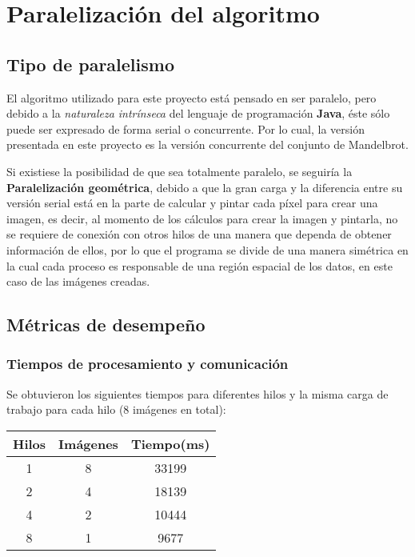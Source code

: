 \documentclass[12pt,a4paper]{article}
\begin{document}
		
	\section{Paralelización del algoritmo}	
		\subsection{Tipo de paralelismo}
			El algoritmo utilizado para este proyecto está pensado en ser paralelo, pero debido a la  \textit{naturaleza intrínseca} del lenguaje de programación \textbf{Java}, éste sólo puede ser expresado de forma serial o concurrente. Por lo cual, la versión presentada en este proyecto es la versión concurrente del conjunto de Mandelbrot.
			
			Si existiese la posibilidad de que sea totalmente paralelo, se seguiría la \textbf{Paralelización geométrica}, debido a que la gran carga y la diferencia entre su versión serial está en la parte de calcular y pintar cada píxel para crear una imagen, es decir, al momento de los cálculos para crear la imagen y pintarla, no se requiere de conexión con otros hilos de una manera que dependa de obtener información de ellos, por lo que el programa se divide de una manera simétrica en la cual cada proceso es responsable de una región espacial de los datos, en este caso de las imágenes creadas.
			
		\subsection{Métricas de desempeño}
			\subsubsection{Tiempos de procesamiento y comunicación}
				Se obtuvieron los siguientes tiempos para diferentes hilos y la misma carga de trabajo para cada hilo (8 imágenes en total):\\
				
					\begin{table}[htbp]
						\centering
						\begin{tabular}{c|c|c}
							Hilos & Imágenes & Tiempo(ms) \\ \hline
							1     & 8        & 33199  \\
							2     & 4        & 18139  \\
							4     & 2        & 10444  \\
							8     & 1        & 9677  
						\end{tabular}
					\end{table}
				
\end{document}
